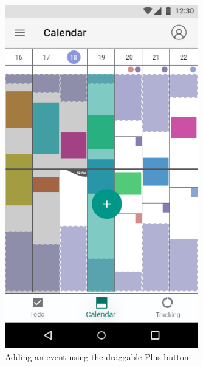 \documentclass[a4paper,11pt]{article} %
\begin{document}
\begin{figure}[h!]
  \centering
  \includegraphics[width=0.75\textwidth]{img/ui-wireframe/Calendar-Add-Action.png}
  \caption{Adding an event using the draggable Plus-button}
\end{figure}
\end{document}
